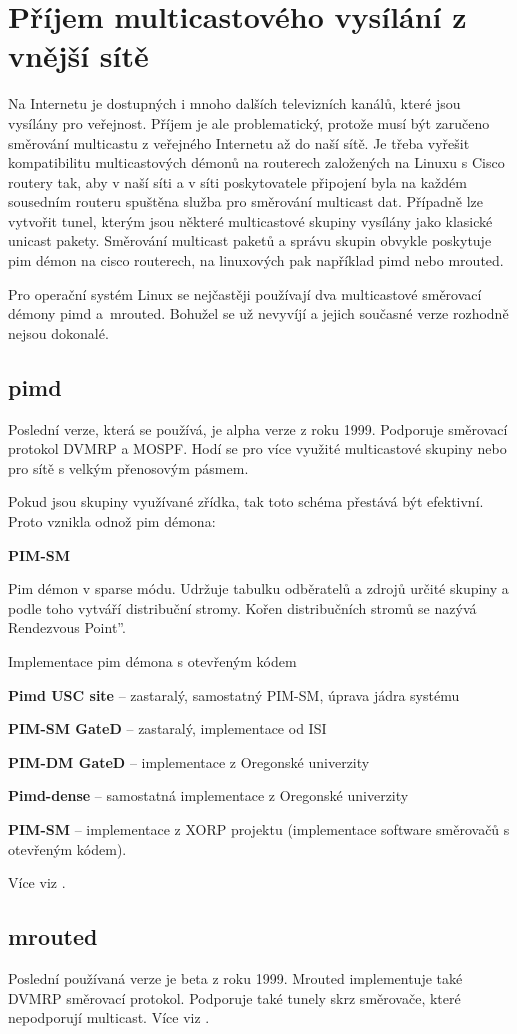 \chapter{Příjem multicastového vysílání z vnější sítě}
Na Internetu je dostupných i mnoho dalších televizních kanálů, které jsou vysílány pro veřejnost. Příjem je ale problematický, protože musí být zaručeno směrování multicastu z veřejného Internetu až do naší sítě. Je třeba vyřešit kompatibilitu multicastových démonů na routerech založených na Linuxu s Cisco routery tak, aby v naší síti a v síti poskytovatele připojení byla na každém sousedním routeru spuštěna služba pro směrování multicast dat. Případně lze vytvořit tunel, kterým jsou některé multicastové skupiny vysílány jako klasické unicast pakety. Směrování multicast paketů a správu skupin obvykle poskytuje pim démon na cisco routerech, na linuxových pak například pimd nebo mrouted.

Pro operační systém Linux se nejčastěji používají dva multicastové směrovací démony pimd a~mrouted. Bohužel se už nevyvíjí a jejich současné verze rozhodně nejsou dokonalé.

\section{pimd}
Poslední verze, která se používá, je alpha verze z roku 1999. Podporuje směrovací protokol DVMRP a MOSPF. Hodí se pro více využité multicastové skupiny nebo pro sítě s velkým přenosovým pásmem.

Pokud jsou skupiny využívané zřídka, tak toto schéma přestává být efektivní. Proto vznikla odnož pim démona:

\textbf{PIM-SM}

Pim démon v sparse módu. Udržuje tabulku odběratelů a zdrojů určité skupiny a podle toho vytváří distribuční stromy. Kořen distribučních stromů se nazývá \quotedblbase Rendezvous Point''.

Implementace pim démona s otevřeným kódem
\bitem
\item \textbf{Pimd USC site} -- zastaralý, samostatný PIM-SM, úprava jádra systému
\item \textbf{PIM-SM GateD} -- zastaralý, implementace od ISI
\item \textbf{PIM-DM GateD} -- implementace z Oregonské univerzity
\item \textbf{Pimd-dense} -- samostatná implementace z Oregonské univerzity
\item \textbf{PIM-SM} -- implementace z XORP projektu (implementace software směrovačů s otevřeným kódem).
\eitem

Více viz \cite{pimdURL}.

\section{mrouted}

Poslední používaná verze je beta z roku 1999. Mrouted implementuje také DVMRP směrovací protokol. Podporuje také tunely skrz směrovače, které nepodporují multicast. Více viz \cite{mroutedURL}.
